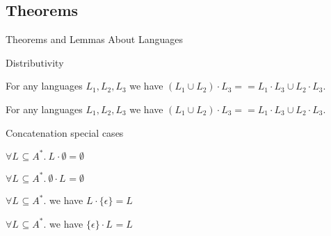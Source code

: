 \documentclass{beamer}
\newcommand{\alphabetSymbol}{A}
\newcommand{\alphabetpow}[1]{\alphabetSymbol^{#1}}
\newcommand{\languagesymbol}{L}
\newcommand{\languagei}[1]{\languagesymbol_{#1}}
\newcommand{\emptyword}{\epsilon}
\newcommand{\concatop}{\cdot}
\newcommand{\unitlang}{\{\emptyword\}}
\begin{document}
\subsection{Theorems}

\begin{frame}
\Huge{Theorems and Lemmas About Languages}
\end{frame}

\begin{frame}{Distributivity}
\begin{theorem}
	\label{lem:clLeftDistributiveAppend}
	For any languages $\languagei{1}, \languagei{2}, \languagei{3}$ we have $(\languagei{1} \cup \languagei{2}) \concatop \languagei{3} == \languagei{1} \concatop \languagei{3} \cup \languagei{2} \concatop \languagei{3}$.
\end{theorem}

\begin{theorem}
	\label{lem:clRightDistributiveAppend}
	For any languages $\languagei{1}, \languagei{2}, \languagei{3}$ we have $(\languagei{1} \cup \languagei{2}) \concatop \languagei{3} == \languagei{1} \concatop \languagei{3} \cup \languagei{2} \concatop \languagei{3}$.
\end{theorem}
\end{frame}

\begin{frame}{Concatenation special cases}
	\begin{theorem}
		$\forall \languagei{} \subseteq \alphabetpow{*}. ~ \languagei{} \concatop \emptyset = \emptyset$
	\end{theorem}
	
	\begin{theorem}
		$\forall \languagei{} \subseteq \alphabetpow{*}. ~ \emptyset \concatop \languagei{} = \emptyset$
	\end{theorem}
	
	\begin{theorem}
		\label{the:rightUnitConcat}
		$\forall \languagei{} \subseteq \alphabetpow{*}.$ we have  $\languagei{} \concatop \unitlang = \languagei{}$
	\end{theorem}
	
	\begin{theorem}
		\label{the:leftUnitConcat}
		$\forall \languagei{} \subseteq \alphabetpow{*}.$ we have $\unitlang \concatop \languagei{} = \languagei{}$
	\end{theorem}
	
\end{frame}
\end{document}
